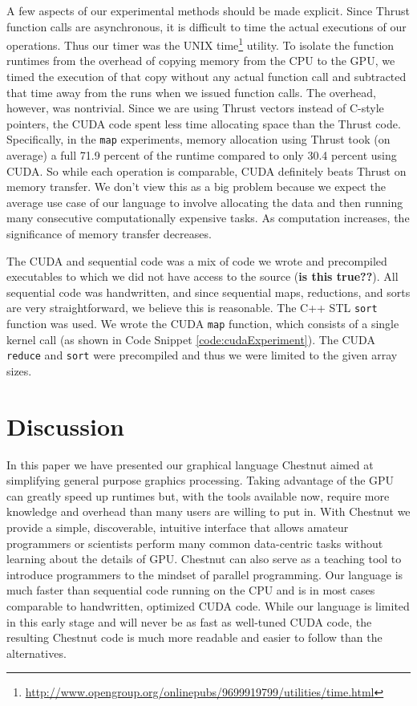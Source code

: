 \documentclass[twocolumn]{article}
\renewcommand{\|}{\origbar} %
\newcommand{\code}[1]{\texttt{#1}}
\begin{document}
A few aspects of our experimental methods should be made explicit. Since Thrust function calls are asynchronous, it is difficult to time the actual executions of our operations. Thus our timer was the UNIX time\footnote{\url{http://www.opengroup.org/onlinepubs/9699919799/utilities/time.html}} utility. To isolate the function runtimes from the overhead of copying memory from the CPU to the GPU, we timed the execution of that copy without any actual function call and subtracted that time away from the runs when we issued function calls. The overhead, however, was nontrivial. Since we are using Thrust vectors instead of C-style pointers, the CUDA code spent less time allocating space than the Thrust code. Specifically, in the \code{map} experiments, memory allocation using Thrust took (on average) a full 71.9 percent of the runtime compared to only 30.4 percent using CUDA. So while each operation is comparable, CUDA definitely beats Thrust on memory transfer. We don't view this as a big problem because we expect the average use case of our language to involve allocating the data and then running many consecutive computationally expensive tasks. As computation increases, the significance of memory transfer decreases.

The CUDA and sequential code was a mix of code we wrote and precompiled executables to which we did not have access to the source ({\bf is this true??}). All sequential code was handwritten, and since sequential maps, reductions, and sorts are very straightforward, we believe this is reasonable. The C++ STL \code{sort} function was used. We wrote the CUDA \code{map} function, which consists of a single kernel call (as shown in Code Snippet \ref{code:cudaExperiment}). The CUDA \code{reduce} and \code{sort} were precompiled and thus we were limited to the given array sizes. 

\section{Discussion}
\label{sec:discussion}

In this paper we have presented our graphical language Chestnut aimed at simplifying general purpose graphics processing. Taking advantage of the GPU can greatly speed up runtimes but, with the tools available now, require more knowledge and overhead than many users are willing to put in. With Chestnut we provide a simple, discoverable, intuitive interface that allows amateur programmers or scientists perform many common data-centric tasks without learning about the details of GPU. Chestnut can also serve as a teaching tool to introduce programmers to the mindset of parallel programming. Our language is much faster than sequential code running on the CPU and is in most cases comparable to handwritten, optimized CUDA code. While our language is limited in this early stage and will never be as fast as well-tuned CUDA code, the resulting Chestnut code is much more readable and easier to follow than the alternatives. 
\end{document}
